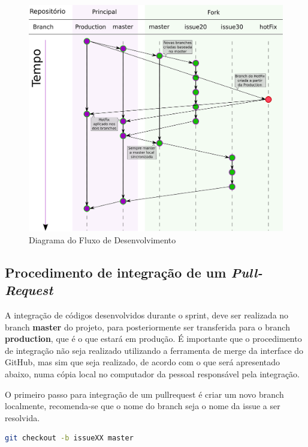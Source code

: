    \begin{figure}[htb]%
        \begin{center}
            \includegraphics[scale=0.65]{./imagens/branchForkDiagram.eps}%
        \end{center}%
        \caption{Diagrama do Fluxo de Desenvolvimento \label{fig:gitflow}}%
    \end{figure}%
    
\clearpage
\subsection{Procedimento de integração de um \textit{Pull-Request}}
A integração de códigos desenvolvidos durante o \gls{sprint}, deve ser realizada no \gls{branch} \textbf{master} do projeto, para posteriormente ser transferida para o \gls{branch} \textbf{production}, que é o que estará em produção. É importante que o procedimento de integração não seja realizado utilizando a ferramenta de \gls{merge} da interface do GitHub, mas sim que seja realizado, de acordo com o que será apresentado abaixo, numa cópia local no computador da pessoal responsável pela integração.

O primeiro passo para integração de um \gls{pullrequest} é criar um novo \gls{branch} localmente, recomenda-se que o nome do \gls{branch} seja o nome da \gls{issue} a ser resolvida.
\begin{lstlisting}[language=bash,caption={Cria uma nova branch chamada issueXX baseada na branch master}]
git checkout -b issueXX master
\end{lstlisting}

